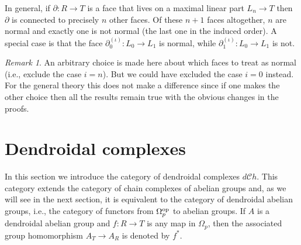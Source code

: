 \documentclass[a4paper]{amsart}
\theoremstyle{plain}
\theoremstyle{definition}
\theoremstyle{remark}
\newtheorem{rem}[thm]{Remark}
\newcommand{\rpd}{\Omega_p}
\newcommand{\To}{\longrightarrow}
\newcommand{\dCh}{d\mathcal{C}h}
\numberwithin{equation}{section}
\numberwithin{figure}{section}
\begin{document}
In general, if $\partial\colon R\To T$ is a face that lives on a maximal linear part $L_n\To T$ then $\partial$ is connected to
precisely $n$ other faces. Of these $n+1$ faces altogether, $n$ are normal and exactly one is not normal (the last one in
the induced order). A special case is that the face $\partial^{(\iota)}_0\colon L_0\To L_1$ is normal, while $\partial^{(\iota)}_1\colon L_0\To L_1$ is
not.

\begin{rem}
    An arbitrary choice is made here about which faces to treat as
    normal (i.e., exclude the case $i=n$). But we could have excluded
    the case $i=0$ instead. For the general theory this does not make a
    difference since if one makes the other choice then all the results
    remain true with the obvious changes in the proofs.
\end{rem}


\section{Dendroidal complexes}
In this section we introduce the category of dendroidal complexes $\dCh$. This category extends the category of chain complexes of abelian groups and, as we will see in the next section, it is equivalent to the category of dendroidal abelian groups, i.e., the category of functors from $\rpd^{{\rm op}}$ to abelian
groups. If $A$ is a dendroidal abelian group and $f\colon R\longrightarrow T$ is any map in $\rpd$, then the associated group homomorphism
$A_T\longrightarrow A_R$ is denoted by $f^*$.
\end{document}
